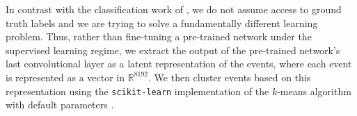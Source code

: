 \documentclass[preprint,12pt]{elsarticle}
\newcommand{\R}{\mathbb{R}}
\begin{document}

In contrast with the classification work of \citet{Kuchera2019}, we do not assume access to ground truth labels and we are trying to solve a fundamentally different learning problem. Thus, rather than fine-tuning a pre-trained network under the supervised learning regime, we extract the output of the pre-trained network's last convolutional layer as a latent representation of the events, where each event is represented as a vector in $\R^{8192}$. We then cluster events based on this representation using the \texttt{scikit-learn} implementation of the $k$-means algorithm with default parameters \cite{Pedregosa2011}.


\end{document}
